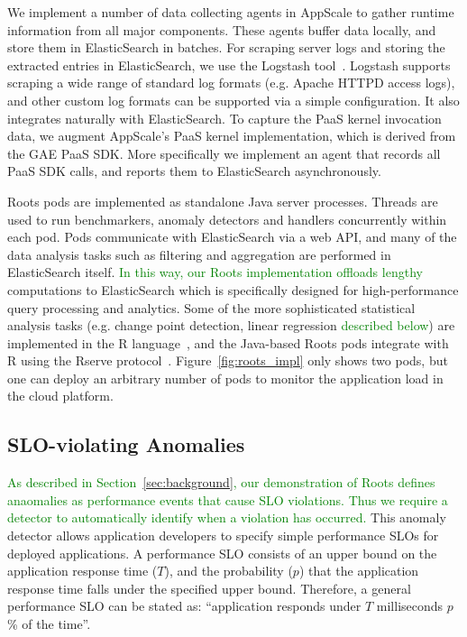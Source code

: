 We implement a number of data collecting agents in AppScale to gather runtime information
from all major components. These agents buffer data locally, and store them in ElasticSearch
in batches. For scraping server logs and storing the extracted entries in ElasticSearch,
we use the Logstash tool~\cite{logstash}. Logstash supports scraping a wide range of standard log formats (e.g. 
Apache HTTPD access logs), and other custom log formats can be supported via a simple configuration.
It also integrates naturally with ElasticSearch.
To capture the PaaS kernel invocation data, we augment AppScale's PaaS kernel implementation,
which is derived from the GAE PaaS SDK. More specifically we implement an agent that records
all PaaS SDK calls, and reports them to ElasticSearch asynchronously. 

Roots pods are implemented as standalone Java server processes. Threads are used to run benchmarkers,
anomaly detectors and handlers concurrently within each pod. Pods communicate with ElasticSearch via
a web API, and many of the data analysis tasks such as filtering and aggregation are performed
in ElasticSearch itself. 
\textcolor{green}{In this way, our Roots implementation offloads lengthy}
computations 
to 
ElasticSearch 
which is specifically designed for high-performance query processing
and analytics. Some of the more sophisticated statistical analysis tasks (e.g. change point detection, 
linear regression \textcolor{green}{described below}) are implemented in the R
language~\cite{XXX},
and the Java-based Roots pods integrate with R using the Rserve protocol~\cite{Urbanek03rserve--}.
Figure~\ref{fig:roots_impl} only shows two pods, but one can deploy an arbitrary number of pods to
monitor the application load in the cloud platform.

\subsection{SLO-violating Anomalies}

\textcolor{green}{As described in Section~\ref{sec:background}, our
demonstration of Roots defines anaomalies as performance events that cause SLO
violations.  Thus we require a detector to automatically identify when a
violation has occurred.}
This anomaly detector
allows application developers to specify simple performance SLOs for deployed applications. A
performance SLO consists of an upper bound on the application response time ($T$), and the probability ($p$)
that the application response time falls under the specified upper bound. Therefore, a general performance 
SLO can be stated as: ``application responds under $T$ milliseconds $p$\% of the time''.

